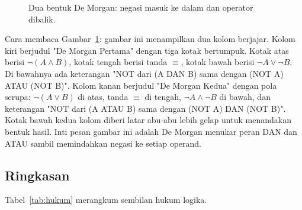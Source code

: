 \documentclass[11pt,a4paper]{article}
\begin{document}
\begin{figure}[H]
	\centering
	\caption{Dua bentuk De Morgan: negasi masuk ke dalam dan operator dibalik.}
	\label{fig:de-morgan}
\end{figure}

Cara membaca Gambar~\ref{fig:de-morgan}: gambar ini menampilkan dua kolom berjajar. Kolom kiri berjudul "De Morgan Pertama" dengan tiga kotak bertumpuk. Kotak atas berisi $\neg(A \wedge B)$, kotak tengah berisi tanda $\equiv$, kotak bawah berisi $\neg A \vee \neg B$. Di bawahnya ada keterangan "NOT dari (A DAN B) sama dengan (NOT A) ATAU (NOT B)". Kolom kanan berjudul "De Morgan Kedua" dengan pola serupa: $\neg(A \vee B)$ di atas, tanda $\equiv$ di tengah, $\neg A \wedge \neg B$ di bawah, dan keterangan "NOT dari (A ATAU B) sama dengan (NOT A) DAN (NOT B)". Kotak bawah kedua kolom diberi latar abu-abu lebih gelap untuk menandakan bentuk hasil. Inti pesan gambar ini adalah De Morgan menukar peran DAN dan ATAU sambil memindahkan negasi ke setiap operand.

\subsection{Ringkasan}

Tabel~\ref{tab:hukum} merangkum sembilan hukum logika.
\end{document}

